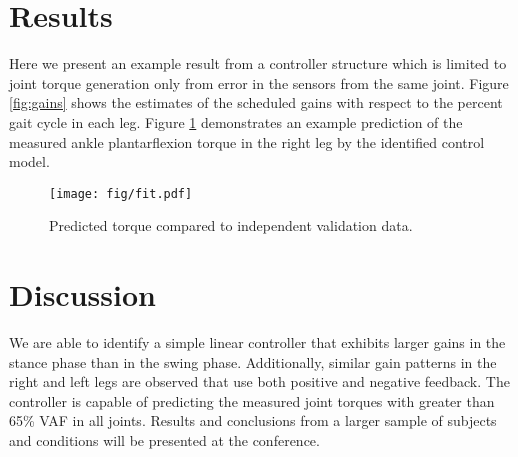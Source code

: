 \documentclass{dw2014}
\begin{document}
\section*{Results}
%
Here we present an example result from a controller structure which is limited
to joint torque generation only from error in the sensors from the same joint.
Figure \ref{fig:gains} shows the estimates of the scheduled gains with respect
to the percent gait cycle in each leg. Figure \ref{fig:fit} demonstrates an
example prediction of the measured ankle plantarflexion torque in the right leg
by the identified control model.
%
\begin{figure}[b]
  \begin{center}
    \texttt{[image: fig/fit.pdf]}
    \caption{Predicted torque compared to independent validation data.}
    \label{fig:fit}
  \end{center}
\end{figure}
%
\section*{Discussion}
%
We are able to identify a simple linear controller that exhibits larger gains
in the stance phase than in the swing phase. Additionally, similar gain
patterns in the right and left legs are observed that use both positive and
negative feedback. The controller is capable of predicting the measured joint
torques with greater than 65\% VAF in all joints. Results and conclusions from
a larger sample of subjects and conditions will be presented at the conference.

%
\end{document}
